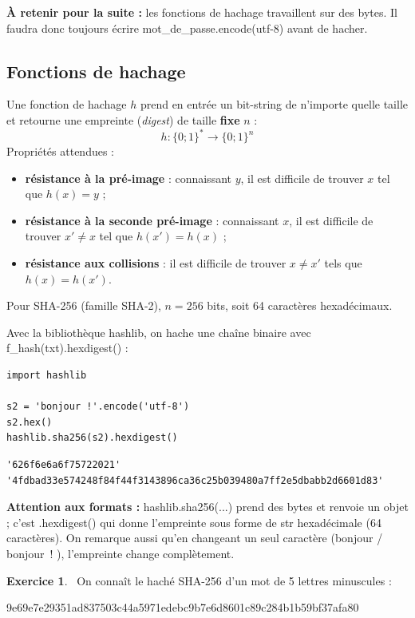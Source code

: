 \documentclass[11pt,a4paper]{article}
\newcommand{\code}[1]{\colorbox{fondcode}{\ttfamily\small #1}}
\newcommand{\q}{\textquotesingle}
\newcommand{\exo}[1]{\par\medskip\textbf{Exercice #1}.\ }
\begin{document}
\textbf{À retenir pour la suite :} les fonctions de hachage travaillent sur des \code{bytes}. Il faudra donc toujours écrire \code{mot\_de\_passe.encode(\q{}utf-8\q{})} avant de hacher.

\subsection{Fonctions de hachage}

\begin{rappel}
Une fonction de hachage $h$ prend en entrée un bit-string de n'importe quelle taille et retourne une empreinte (\emph{digest}) de taille \textbf{fixe} $n$ :
\[ h : \{0;1\}^* \longrightarrow \{0;1\}^n \]
Propriétés attendues :
\begin{itemize}
  \item \textbf{résistance à la pré-image} : connaissant $y$, il est difficile de trouver $x$ tel que $h(x) = y$ ;
  \item \textbf{résistance à la seconde pré-image} : connaissant $x$, il est difficile de trouver $x' \neq x$ tel que $h(x') = h(x)$ ;
  \item \textbf{résistance aux collisions} : il est difficile de trouver $x \neq x'$ tels que $h(x) = h(x')$.
\end{itemize}
Pour SHA-256 (famille SHA-2), $n = 256$ bits, soit 64 caractères hexadécimaux.
\end{rappel}

Avec la bibliothèque \code{hashlib}, on hache une chaîne binaire avec \code{f\_hash(txt).hexdigest()} :

\begin{lstlisting}
import hashlib

s2 = 'bonjour !'.encode('utf-8')
s2.hex()
hashlib.sha256(s2).hexdigest()
\end{lstlisting}

\begin{lstlisting}[style=sortie]
'626f6e6a6f75722021'
'4fdbad33e574248f84f44f3143896ca36c25b039480a7ff2e5dbabb2d6601d83'
\end{lstlisting}

\textbf{Attention aux formats :} \code{hashlib.sha256(...)} prend des \code{bytes} et renvoie un objet ; c'est \code{.hexdigest()} qui donne l'empreinte sous forme de \code{str} hexadécimale (64 caractères). On remarque aussi qu'en changeant un seul caractère (\og bonjour \fg{} / \og bonjour~! \fg{}), l'empreinte change complètement.

\exo{1} On connaît le haché SHA-256 d'un mot de 5 lettres minuscules :
\begin{center}\ttfamily\small 9e69e7e29351ad837503c44a5971edebc9b7e6d8601c89c284b1b59bf37afa80\end{center}
\end{document}
